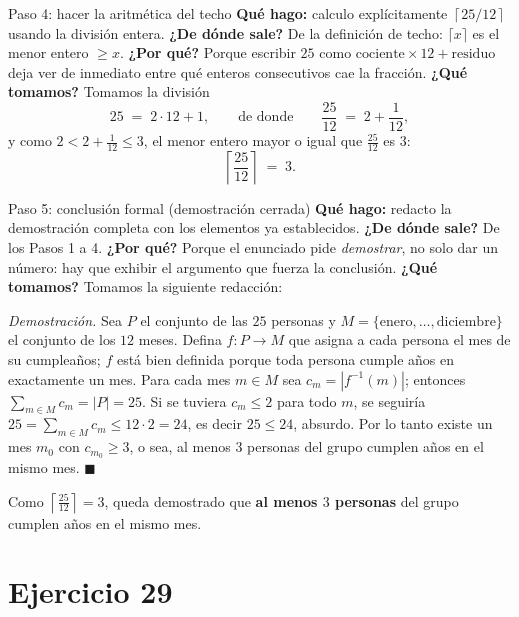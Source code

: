 \documentclass[11pt]{article}
\begin{document}
\begin{sol}
\begin{paso}{Paso 4: hacer la aritm\'etica del techo}
\textbf{Qu\'e hago:} calculo expl\'icitamente $\left\lceil 25/12\right\rceil$ usando la divisi\'on entera.
\textbf{¿De d\'onde sale?} De la definici\'on de techo: $\lceil x\rceil$ es el menor entero $\ge x$.
\textbf{¿Por qu\'e?} Porque escribir $25$ como $\text{cociente}\times 12 + \text{residuo}$ deja ver de inmediato entre qu\'e enteros consecutivos cae la fracci\'on.
\textbf{¿Qu\'e tomamos?} Tomamos la divisi\'on
\[
25 \;=\; 2\cdot 12 + 1 ,
\qquad\text{de donde}\qquad
\frac{25}{12} \;=\; 2 + \frac{1}{12},
\]
y como $2 < 2+\tfrac{1}{12} \le 3$, el menor entero mayor o igual que $\tfrac{25}{12}$ es $3$:
\[
\left\lceil \frac{25}{12} \right\rceil \;=\; 3 .
\]
\end{paso}

\begin{paso}{Paso 5: conclusi\'on formal (demostraci\'on cerrada)}
\textbf{Qu\'e hago:} redacto la demostraci\'on completa con los elementos ya establecidos.
\textbf{¿De d\'onde sale?} De los Pasos 1 a 4.
\textbf{¿Por qu\'e?} Porque el enunciado pide \emph{demostrar}, no solo dar un n\'umero: hay que exhibir el argumento que fuerza la conclusi\'on.
\textbf{¿Qu\'e tomamos?} Tomamos la siguiente redacci\'on:

\medskip
\emph{Demostraci\'on.} Sea $P$ el conjunto de las $25$ personas y $M=\{\text{enero},\dots,\text{diciembre}\}$ el conjunto de los $12$ meses. Defina $f:P\to M$ que asigna a cada persona el mes de su cumplea\~nos; $f$ est\'a bien definida porque toda persona cumple a\~nos en exactamente un mes. Para cada mes $m\in M$ sea $c_m=|f^{-1}(m)|$; entonces $\sum_{m\in M}c_m = |P| = 25$. Si se tuviera $c_m\le 2$ para todo $m$, se seguir\'ia $25=\sum_{m\in M}c_m \le 12\cdot 2 = 24$, es decir $25\le 24$, absurdo. Por lo tanto existe un mes $m_0$ con $c_{m_0}\ge 3$, o sea, al menos $3$ personas del grupo cumplen a\~nos en el mismo mes. $\blacksquare$
\end{paso}

\end{sol}

\begin{resp}
Como $\left\lceil \frac{25}{12}\right\rceil = 3$, queda demostrado que \textbf{al menos $3$ personas} del grupo cumplen a\~nos en el mismo mes.
\end{resp}

\section*{Ejercicio 29}
\end{document}
